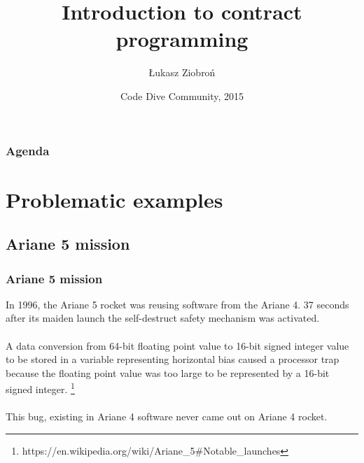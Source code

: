 \documentclass{beamer}
\title[Crisis]{Introduction to contract programming}
\author{Łukasz Ziobroń}
\institute{Nokia}
\date{Code Dive Community, 2015}
\begin{document}
\begin{frame}
\titlepage
\end{frame}

\begin{frame}
\frametitle{Agenda}
\tableofcontents[hideallsubsections]
\end{frame}


\section{Problematic examples}
\begin{frame}
\sectionpage
\end{frame}

\subsection{Ariane 5 mission}
\begin{frame}
\frametitle{Ariane 5 mission}
{
  In 1996, the Ariane 5 rocket was reusing software from the Ariane 4. 37 seconds after its maiden launch the self-destruct safety mechanism was activated. \\~\\
  A data conversion from 64-bit floating point value to 16-bit signed integer value to be stored in a variable representing horizontal bias caused a processor trap because the floating point value was too large to be represented by a 16-bit signed integer. \footnote{https://en.wikipedia.org/wiki/Ariane\_5\#Notable\_launches} \\~\\
  This bug, existing in Ariane 4 software never came out on Ariane 4 rocket.
}
\end{frame}
\end{document}
